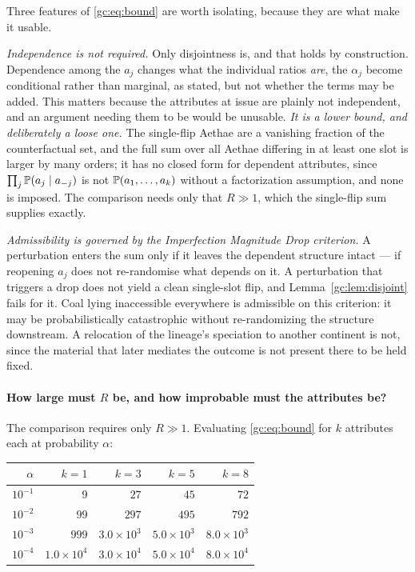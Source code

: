 \begin{remark}
\label{gc:rem:boundrequires}
Three features of \eqref{gc:eq:bound} are worth isolating, because they
are what make it usable.

\emph{Independence is not required.} Only disjointness is, and that
holds by construction. Dependence among the $a_j$ changes what the
individual ratios \emph{are}, the $\alpha_j$ become conditional
rather than marginal, as stated, but not whether the terms may be
added. This matters because the attributes at issue are plainly not
independent, and an argument needing them to be would be unusable. \emph{It is a lower bound, and deliberately a loose one.} The
single-flip Aethae are a vanishing fraction of the counterfactual set,
and the full sum over all Aethae differing in at least one slot is
larger by many orders; it has no closed form for dependent attributes,
since $\prod_j\mathbb{P}(a_j\mid a_{-j})$ is not $\mathbb{P}(a_1,\dots,a_k)$ without
a factorization assumption, and none is imposed. The comparison needs
only that $R\gg1$, which the single-flip sum supplies exactly.

\emph{Admissibility is governed by the Imperfection Magnitude Drop
criterion.} A perturbation enters the sum only if it leaves the
dependent structure intact --- if reopening $a_j$ does not re-randomise
what depends on it. A perturbation that triggers a drop does not yield a
clean single-slot flip, and Lemma~\ref{gc:lem:disjoint} fails for it.
Coal lying inaccessible everywhere is admissible on this criterion: it may
be probabilistically catastrophic without re-randomizing the structure
downstream. A relocation of the lineage's speciation to another
continent is not, since the material that later mediates the outcome is
not present there to be held fixed.
\end{remark}

\paragraph{How large must $R$ be, and how improbable must the
attributes be?} The comparison requires only $R\gg1$. Evaluating
\eqref{gc:eq:bound} for $k$ attributes each at probability $\alpha$:

\begin{center}\small
\begin{tabular}{@{}rrrrr@{}}
\toprule
$\alpha$ & $k=1$ & $k=3$ & $k=5$ & $k=8$\\
\midrule
$10^{-1}$ & $9$ & $27$ & $45$ & $72$\\
$10^{-2}$ & $99$ & $297$ & $495$ & $792$\\
$10^{-3}$ & $999$ & $3.0\times10^{3}$ & $5.0\times10^{3}$ & $8.0\times10^{3}$\\
$10^{-4}$ & $1.0\times10^{4}$ & $3.0\times10^{4}$ & $5.0\times10^{4}$ & $8.0\times10^{4}$\\
\bottomrule
\end{tabular}
\end{center}

